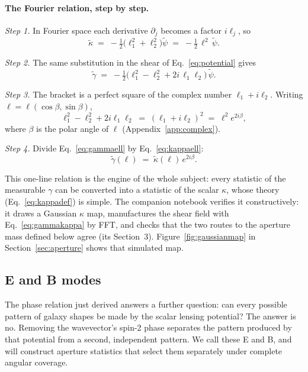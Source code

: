 \documentclass[11pt]{article}
\newcommand{\bell}{\boldsymbol{\ell}}
\numberwithin{equation}{section}
\begin{document}
\paragraph{The Fourier relation, step by step.}
\emph{Step 1.}  In Fourier space each derivative $\partial_j$ becomes
a factor $i\ell_j$, so
\begin{equation}
  \tilde\kappa \;=\; -\tfrac{1}{2}\bigl(\ell_1^2 + \ell_2^2\bigr)
  \tilde\psi \;=\; -\tfrac{1}{2}\,\ell^2\,\tilde\psi .
  \label{eq:kappaell}
\end{equation}

\emph{Step 2.}  The same substitution in the shear of
Eq.~\eqref{eq:potential} gives
\begin{equation}
  \tilde\gamma
  \;=\; -\tfrac{1}{2}\bigl(\ell_1^2 - \ell_2^2
  + 2i\,\ell_1\ell_2\bigr)\,\tilde\psi .
  \label{eq:gammaell}
\end{equation}

\emph{Step 3.}  The bracket is a perfect square of the complex number
$\ell_1 + i\ell_2$.  Writing $\bell = \ell(\cos\beta, \sin\beta)$,
\begin{equation}
  \ell_1^2 - \ell_2^2 + 2i\ell_1\ell_2
  \;=\; (\ell_1 + i\ell_2)^2
  \;=\; \ell^2 e^{2i\beta} ,
  \label{eq:square}
\end{equation}
where $\beta$ is the polar angle of $\bell$
(Appendix~\ref{app:complex}).

\emph{Step 4.}  Divide Eq.~\eqref{eq:gammaell} by
Eq.~\eqref{eq:kappaell}:
\begin{equation}
  \tilde\gamma(\bell) \;=\; \tilde\kappa(\bell)\, e^{2i\beta} .
  \label{eq:gammakappa}
\end{equation}

This one-line relation is the engine of the whole subject: every
statistic of the measurable $\gamma$ can be converted into a
statistic of the scalar $\kappa$, whose theory
(Eq.~\eqref{eq:kappadef}) is simple.  The companion notebook verifies
it constructively: it draws a Gaussian $\kappa$ map, manufactures the
shear field with Eq.~\eqref{eq:gammakappa} by FFT, and checks that
the two routes to the aperture mass defined below agree (its
Section~3).  Figure~\ref{fig:gaussianmap} in
Section~\ref{sec:aperture} shows that simulated map.

\subsection{E and B modes}
\label{sec:eb}

The phase relation just derived answers a further question: can every
possible pattern of galaxy shapes be made by the scalar lensing
potential? The answer is no. Removing the wavevector's spin-2 phase
separates the pattern produced by that potential from a second,
independent pattern. We call these E and B, and will construct aperture
statistics that select them separately under complete angular coverage.
\end{document}
